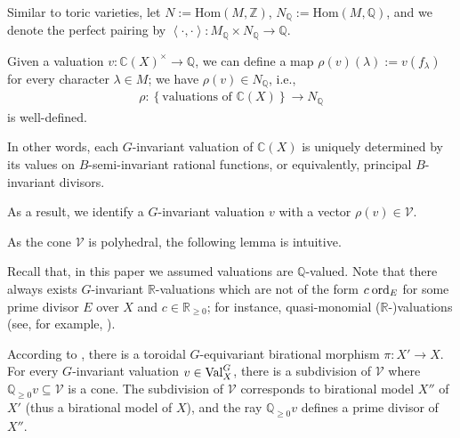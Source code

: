 \documentclass[11pt, oneside]{amsart}
\newtheorem{lemma}[theorem]{Lemma}
\newenvironment{sketchproof}{%
  \renewcommand{\proofname}{Proof (sketch)}\proof
}{\endproof}
\def\{{\mathopen{}\left\lbrace} \def\}{\right\rbrace\mathclose{}}
\newcommand{\<}{\left\langle} \renewcommand{\>}{\right\rangle}
\newcommand{\Hom}{\mathrm{Hom}}
\begin{document}
\newcommand{\V}{\mathcal{V}}

Similar to toric varieties, let $N := \Hom(M, \mathbb{Z})$, $N_\mathbb{Q} := \Hom(M, \mathbb{Q})$, and we denote the perfect pairing by $\<\cdot, \cdot\> : M_\mathbb{Q} \times N_\mathbb{Q} \to \mathbb{Q}$.

Given a valuation $v : \mathbb{C}(X)^\times \to \mathbb{Q}$, we can define a map $\rho(v)(\lambda) := v(f_\lambda)$ for every character $\lambda \in M$; we have $\rho(v) \in N_\mathbb{Q}$, i.e.,
\begin{equation}
\begin{aligned}
	\rho: \{\text{valuations of }\mathbb{C}(X)\} \to N_\mathbb{Q}
\end{aligned}
\end{equation}
is well-defined.

\begin{remark*}
	In other words, each $G$-invariant valuation of $\mathbb{C}(X)$ is uniquely determined by its values on $B$-semi-invariant rational functions, or equivalently, principal $B$-invariant divisors.
\end{remark*}

As a result, we identify a $G$-invariant valuation $v$ with a vector $\rho(v) \in \V$.

As the cone $\V$ is polyhedral, the following lemma is intuitive.
\begin{remark*}
	Recall that, in this paper we assumed valuations are $\mathbb{Q}$-valued. Note that there always exists $G$-invariant $\mathbb{R}$-valuations which are not of the form $c \: \mathrm{ord}_E$ for some prime divisor $E$ over $X$ and $c \in \mathbb{R}_{\geq 0}$; for instance, quasi-monomial ($\mathbb{R}$-)valuations (see, for example, \cite[\S3]{JM_val_asym_inva_seq_i}).
\end{remark*}
\begin{sketchproof}
	According to \cite[Proposition 2, \S2.4]{Brion_var_sph}, there is a toroidal $G$-equivariant birational morphism $\pi: X' \to X$. For every $G$-invariant valuation $v \in \mathrm{Val}^G_X$, there is a subdivision of $\V$ where $\mathbb{Q}_{\geq 0} v \subseteq \V$ is a cone. The subdivision of $\V$ corresponds to birational model $X''$ of $X'$ (thus a birational model of $X$), and the ray $\mathbb{Q}_{\geq 0} v$ defines a prime divisor of $X''$.
\end{sketchproof}
\end{document}
